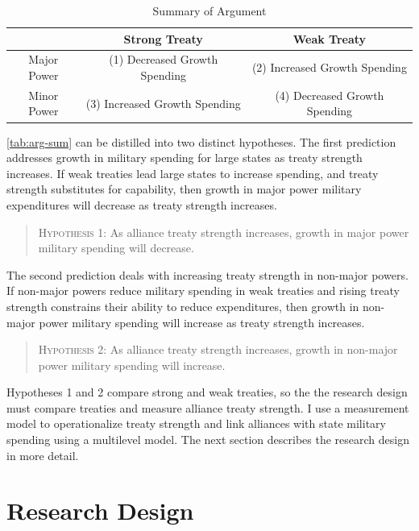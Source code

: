\documentclass[12pt]{article}
\begin{document}
\begin{table}
\begin{center}
\begin{tabular}{ccc}
      & Strong Treaty      & Weak Treaty  \\
\hline
Major Power & (1)  Decreased Growth Spending   & (2)  Increased Growth Spending        \\
\hline
Minor Power & (3) Increased Growth Spending   & (4) Decreased Growth Spending       \\ 
\hline 
\end{tabular}
\end{center}
\caption{Summary of Argument}
\label{tab:arg-sum}
\end{table}


\autoref{tab:arg-sum} can be distilled into two distinct hypotheses. 
The first prediction addresses growth in military spending for large states as treaty strength increases. 
If weak treaties lead large states to increase spending, and treaty strength substitutes for capability, then growth in major power military expenditures will decrease as treaty strength increases. 


\begin{quote}
\textsc{Hypothesis 1}: As alliance treaty strength increases, growth in major power military spending will decrease. 
\end{quote}


The second prediction deals with increasing treaty strength in non-major powers. 
If non-major powers reduce military spending in weak treaties and rising treaty strength constrains their ability to reduce expenditures, then growth in non-major power military spending will increase as treaty strength increases. 


\begin{quote}
\textsc{Hypothesis 2}: As alliance treaty strength increases, growth in non-major power military spending will increase. 
\end{quote}


Hypotheses 1 and 2 compare strong and weak treaties, so the the research design must compare treaties and measure alliance treaty strength.  
I use a measurement model to operationalize treaty strength and link alliances with state military spending using a multilevel model. 
The next section describes the research design in more detail. 


\section{Research Design} 
\end{document}
